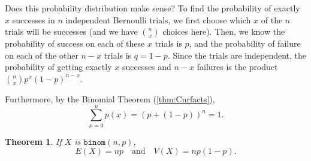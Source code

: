 \documentclass[
]{book}
\newtheorem{theorem}{Theorem}[chapter]
\theoremstyle{definition}
\theoremstyle{definition}
\theoremstyle{definition}
\theoremstyle{definition}
\theoremstyle{remark}
\begin{document}
Does this probability distribution make sense? To find the probability of exactly \(x\) successes in \(n\) independent Bernoulli trials, we first choose which \(x\) of the \(n\) trials will be successes (and we have \(\binom{n}{x}\) choices here). Then, we know the probability of success on each of these \(x\) trials is \(p\), and the probability of failure on each of the other \(n-x\) trials is \(q = 1-p\). Since the trials are independent, the probability of getting exactly \(x\) successes and \(n-x\) failures is the product \(\binom{n}{x}p^x(1-p)^{n-x}.\)

Furthermore, by the Binomial Theorem (\ref{thm:Cnrfacts}), \[\sum_{x = 0}^n p(x) = (p+(1-p))^n = 1.\]

\begin{theorem}
\protect\hypertarget{thm:binomial-distribution-EandV}{}\label{thm:binomial-distribution-EandV}If \(X\) is \(\texttt{binom}(n,p)\), \[E(X) = np~~~\text{ and }~~~ V(X) = np(1-p).\]
\end{theorem}
\end{document}
